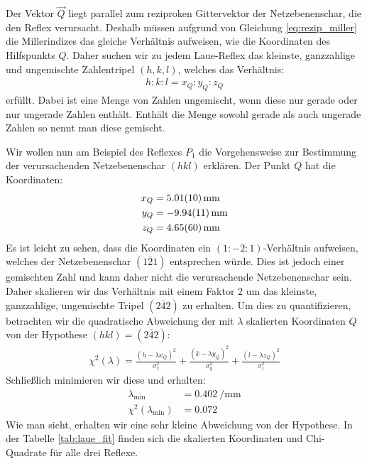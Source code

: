 \documentclass[11pt, a4paper]{article}
\begin{document}
Der Vektor $\vec{Q}$ liegt parallel zum reziproken Gittervektor der Netzebenenschar, die den Reflex verursacht.
Deshalb müssen aufgrund von Gleichung \ref{eq:rezip_miller} die Millerindizes das gleiche Verhältnis aufweisen, wie die Koordinaten des Hilfspunkts $Q$.
Daher suchen wir zu jedem Laue-Reflex das kleinste, ganzzahlige und ungemischte Zahlentripel $(h,k,l)$, welches das Verhältnis:
\begin{align}
  h:k:l = x_Q : y_Q : z_Q
\end{align}
erfüllt.
Dabei ist eine Menge von Zahlen ungemischt, wenn diese nur gerade oder nur ungerade Zahlen enthält.
Enthält die Menge sowohl gerade als auch ungerade Zahlen so nennt man diese gemischt.

Wir wollen nun am Beispiel des Reflexes $P_1$ die Vorgehensweise zur Bestimmung der verursachenden Netzebenenschar $(hkl)$ erklären.
Der Punkt $Q$ hat die Koordinaten:
\begin{align*}
  x_Q &= \SI{5.01 +- 0.10}{\milli\metre} \\
  y_Q &= \SI{-9.94 +- 0.11}{\milli\metre} \\
  z_Q &= \SI{4.65 +- 0.60}{\milli\metre}
\end{align*}
Es ist leicht zu sehen, dass die Koordinaten ein $(1:-2:1)$-Verhältnis aufweisen, welches der Netzebenenschar $(1\overline{2}1)$ entsprechen würde.
Dies ist jedoch einer gemischten Zahl und kann daher nicht die verursachende Netzebenenschar sein.
Daher skalieren wir das Verhältnis mit einem Faktor $2$ um das kleinste, ganzzahlige, ungemischte Tripel $(2\overline{4}2)$ zu erhalten.
Um dies zu quantifizieren, betrachten wir die quadratische Abweichung der mit $\lambda$ skalierten Koordinaten $Q$ von der Hypothese $(hkl) = (2\overline{4}2)$:
\begin{align}
  \chi^2(\lambda) = \frac{(h-\lambda x_Q)^2}{\sigma_x^2} + \frac{(k-\lambda y_Q)^2}{\sigma_y^2} + \frac{(l-\lambda z_Q)^2}{\sigma_z^2}
\end{align}
Schließlich minimieren wir diese und erhalten:
\begin{align*}
  \lambda_\mathrm{min} &= \SI{0,402}{\per\milli\metre} \\
  \chi^2(\lambda_\mathrm{min}) &= \num{0,072}
\end{align*}
Wie man sieht, erhalten wir eine sehr kleine Abweichung von der Hypothese. In der Tabelle \ref{tab:laue_fit} finden sich die skalierten Koordinaten und Chi-Quadrate für alle drei Reflexe.
\end{document}
